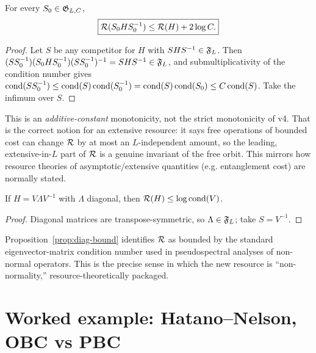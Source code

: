 \begin{proposition}
\label{prop:monotone}
For every $S_0\in\mathfrak G_{L,C}$,
\begin{equation}
\boxed{\mathcal R(S_0HS_0^{-1})\le\mathcal R(H)+2\log C.}
\end{equation}
\end{proposition}

\begin{proof}
Let $S$ be any competitor for $H$ with $SHS^{-1}\in\mathfrak F_L$. Then
$(SS_0^{-1})(S_0HS_0^{-1})(SS_0^{-1})^{-1}=SHS^{-1}\in\mathfrak F_L$, and
submultiplicativity of the condition number gives
$\operatorname{cond}(SS_0^{-1})\le\operatorname{cond}(S)\operatorname{cond}(S_0^{-1})=\operatorname{cond}(S)\operatorname{cond}(S_0)\le
C\operatorname{cond}(S)$. Take the infimum over $S$.
\end{proof}

\begin{remark}
This is an \emph{additive-constant} monotonicity, not the strict
monotonicity of v4. That is the correct notion for an extensive
resource: it says free operations of bounded cost can change
$\mathcal R$ by at most an $L$-independent amount, so the leading,
extensive-in-$L$ part of $\mathcal R$ is a genuine invariant of the free
orbit. This mirrors how resource theories of asymptotic/extensive
quantities (e.g. entanglement cost) are normally stated.
\end{remark}

\begin{proposition}
\label{prop:diag-bound}
If $H=V\Lambda V^{-1}$ with $\Lambda$ diagonal, then
$\mathcal R(H)\le\log\operatorname{cond}(V)$.
\end{proposition}
\begin{proof}
Diagonal matrices are transpose-symmetric, so $\Lambda\in\mathfrak F_L$;
take $S=V^{-1}$.
\end{proof}

\begin{remark}
Proposition~\ref{prop:diag-bound} identifies $\mathcal R$ as bounded by
the standard eigenvector-matrix condition number used in
pseudospectral analyses of non-normal operators. This is the
precise sense in which the new resource is ``non-normality,''
resource-theoretically packaged.
\end{remark}

\section{Worked example: Hatano--Nelson, OBC vs PBC}
\label{sec:hn-pbc}

